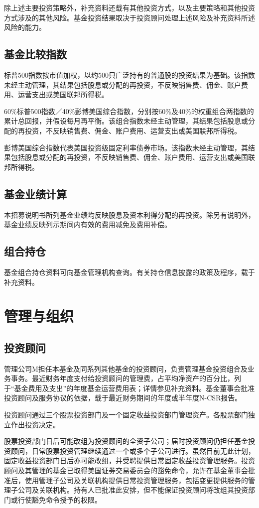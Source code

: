 \documentclass[UTF8,fontset=none,11pt,a4paper]{ctexart}
\begin{document}
除上述主要投资策略外，补充资料还载有其他投资方式，以及主要策略和其他投资方式涉及的其他风险。基金投资结果取决于投资顾问处理上述风险及补充资料所述风险的能力。


\subsection*{基金比较指数}
标普500指数按市值加权，以约500只广泛持有的普通股的投资结果为基础。该指数未经主动管理，其结果包括股息或分配的再投资，不反映销售费、佣金、账户费用、运营支出或美国联邦所得税。


60\%标普500指数／40\%彭博美国综合指数，分别按60\%及40\%的权重组合两指数的累计总回报，并假设每月再平衡。该组合指数未经主动管理，其结果包括股息或分配的再投资，不反映销售费、佣金、账户费用、运营支出或美国联邦所得税。


彭博美国综合指数代表美国投资级固定利率债券市场。该指数未经主动管理，其结果包括股息或分配的再投资，不反映销售费、佣金、账户费用、运营支出或美国联邦所得税。


\subsection*{基金业绩计算}
本招募说明书所列基金业绩均反映股息及资本利得分配的再投资。除另有说明外，基金业绩反映列示期间内有效的费用减免及费用补偿。


\subsection*{组合持仓}
基金组合持仓资料可向基金管理机构查询。有关持仓信息披露的政策及程序，载于补充资料。


\section*{管理与组织}
\subsection*{投资顾问}
管理公司M担任本基金及同系列其他基金的投资顾问，负责管理基金投资组合及业务事务。最近财务年度支付给投资顾问的管理费，占平均净资产的百分比，列于“基金费用及支出”的年度基金运营费用表；详情参见补充资料。基金董事会批准投资顾问及服务协议的依据，载于最近财务期间的年度或半年度N-CSR报告。


投资顾问通过三个股票投资部门及一个固定收益投资部门管理资产。各股票部门独立作出投资决定。


股票投资部门日后可能改组为投资顾问的全资子公司；届时投资顾问仍担任基金投资顾问，日常股票投资管理继续通过一个或多个子公司进行。虽然目前无此计划，固定收益投资部门日后亦可能改组，并受聘提供日常固定收益投资管理服务。投资顾问及其管理的基金已取得美国证券交易委员会的豁免命令，允许在基金董事会批准后，使用管理子公司及关联机构提供日常投资管理服务，包括变更提供服务的管理子公司及关联机构。持有人已批准此安排，但不能保证投资顾问将改组其投资部门或行使豁免命令授予的权限。
\end{document}
